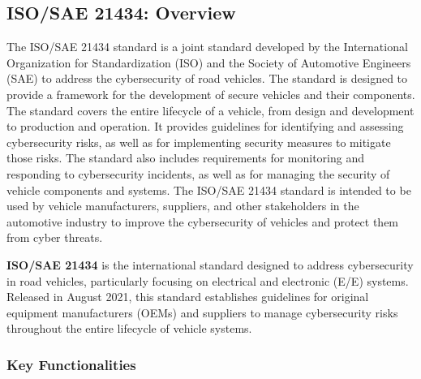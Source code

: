 \subsection{ISO/SAE 21434: Overview}\label{subsec:iso-sae-21434}

The ISO/SAE 21434 standard is a joint standard developed by the International Organization for Standardization (ISO) and the Society of Automotive Engineers (SAE) to address the cybersecurity of road vehicles.
The standard is designed to provide a framework for the development of secure vehicles and their components.
The standard covers the entire lifecycle of a vehicle, from design and development to production and operation.
It provides guidelines for identifying and assessing cybersecurity risks, as well as for implementing security measures to mitigate those risks.
The standard also includes requirements for monitoring and responding to cybersecurity incidents, as well as for managing the security of vehicle components and systems.
The ISO/SAE 21434 standard is intended to be used by vehicle manufacturers,
suppliers, and other stakeholders in the automotive industry to improve the cybersecurity of vehicles and protect them from cyber threats\cite{iso-correlation}.

\textbf{ISO/SAE 21434} is the international standard designed to address cybersecurity in road vehicles, particularly focusing on electrical and electronic (E/E) systems.
Released in August 2021, this standard establishes guidelines for original equipment manufacturers (OEMs) and suppliers to manage cybersecurity risks throughout the entire lifecycle of vehicle systems.

\subsubsection{Key Functionalities}\label{subsubsec:key-functionalities}


